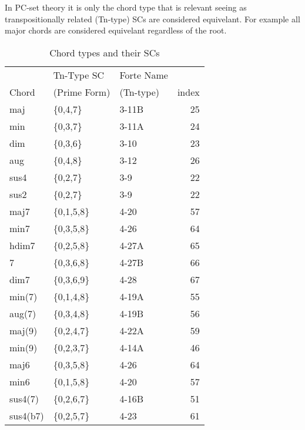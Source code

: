 \documentclass{article}
\begin{document}
In PC-set theory it is only the chord type that is relevant seeing as
transpositionally related (Tn-type) SCs are considered equivelant. For
example all major chords are considered equivelant regardless of the
root.
\begin{table}[htb]
\caption{Chord types and their SCs} 
\begin{center}
\begin{tabular}{lllr}
\hline
             &  Tn-Type SC            &  Forte Name  &         \\
 Chord       &  (Prime Form)          &  (Tn-type)   &  index  \\
\hline
 maj         &  \{0,4,7\}             &  3-11B       &     25  \\
 min         &  \{0,3,7\}             &  3-11A       &     24  \\
 dim         &  \{0,3,6\}             &  3-10        &     23  \\
 aug         &  \{0,4,8\}             &  3-12        &     26  \\
 sus4        &  \{0,2,7\}             &  3-9         &     22  \\
 sus2        &  \{0,2,7\}             &  3-9         &     22  \\
\hline
 maj7        &  \{0,1,5,8\}           &  4-20        &     57  \\
 min7        &  \{0,3,5,8\}           &  4-26        &     64  \\
 hdim7       &  \{0,2,5,8\}           &  4-27A       &     65  \\
 7           &  \{0,3,6,8\}           &  4-27B       &     66  \\
 dim7        &  \{0,3,6,9\}           &  4-28        &     67  \\
 min(7)      &  \{0,1,4,8\}           &  4-19A       &     55  \\
 aug(7)      &  \{0,3,4,8\}           &  4-19B       &     56  \\
 maj(9)      &  \{0,2,4,7\}           &  4-22A       &     59  \\
 min(9)      &  \{0,2,3,7\}           &  4-14A       &     46  \\
 maj6        &  \{0,3,5,8\}           &  4-26        &     64  \\
 min6        &  \{0,1,5,8\}           &  4-20        &     57  \\
 sus4(7)     &  \{0,2,6,7\}           &  4-16B       &     51  \\
 sus4(b7)    &  \{0,2,5,7\}           &  4-23        &     61  \\

\end{tabular}
\end{center}
\end{table}
\end{document}
